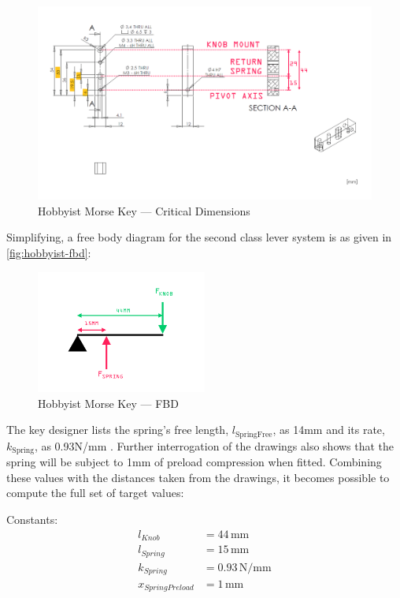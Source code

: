\documentclass[10pt]{article}
\begin{document}
\begin{figure}[H]
	\centering
	\includegraphics[width=\textwidth]{./assets/03-hobbyist-dims.png}
	\caption{Hobbyist Morse Key --- Critical Dimensions \cite{giangrandi2025}}
	\label{fig:hobbyist-dimensions}
\end{figure}

Simplifying, a free body diagram for the second class lever system is as given in
\autoref{fig:hobbyist-fbd}:

\begin{figure}[H]
	\centering
	\includegraphics[width=0.5\textwidth]{./assets/04-fbd.png}
	\caption{Hobbyist Morse Key --- FBD}
	\label{fig:hobbyist-fbd}
\end{figure}

The key designer lists the spring's free length, $l_{\text{SpringFree}}$, as 14mm and its rate,
$k_{\text{Spring}}$, as 0.93N/mm \cite{giangrandi2025}. Further interrogation of the drawings also
shows that the spring will be subject to 1mm of preload compression when fitted. Combining these
values with the distances taken from the drawings, it becomes possible to compute the full set of
target values:

Constants:
\begin{align*}
	l_{Knob}          & = 44 \, \mathrm{mm}     \\
	l_{Spring}        & = 15 \, \mathrm{mm}     \\
	k_{Spring}        & = 0.93 \, \mathrm{N/mm} \\
	x_{SpringPreload} & = 1 \, \mathrm{mm}
\end{align*}
\end{document}
